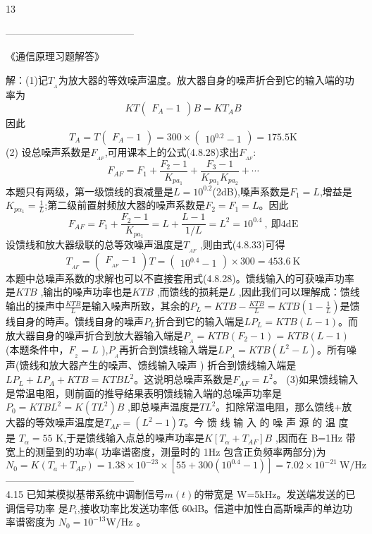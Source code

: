 \documentclass[utf8]{article}
\begin{document}
13

---------------------------------------

《通信原理习题解答》

解：(1)记$T_{_A}$为放大器的等效噪声温度。放大器自身的噪声折合到它的输入端的功率为
$$KT\begin{pmatrix}F_A-1\end{pmatrix}B=KT_AB$$
因此
$$T_A=T\begin{pmatrix}F_A-1\end{pmatrix}=300\times\begin{pmatrix}10^{0.2}-1\end{pmatrix}=175.5\text{K}$$
(2) 设总噪声系数是$F_{_{AF}}$,可用课本上的公式(4.8.28)求出$F_{_{AF}}:$
$$F_{AF}=F_{1}+\frac{F_{2}-1}{K_{pa_{1}}}+\frac{F_{3}-1}{K_{pa_{1}}K_{pa_{2}}}+\cdots $$
本题只有两级，第一级馈线的衰减量是$L=10^{0.2}$(2dB),嗓声系数是$F_1=L$,增益是
$K_{p\alpha_{1}}=\frac{1}{L}$;第二级前置射频放大器的噪声系数是$F_2=F_1=L$。因此
$$F_{AF}=F_{1}+\frac{F_{2}-1}{K_{pa_{1}}}=L+\frac{L-1}{1/L}=L^{2}=10^{0.4}\:,\:\text{即4dE}$$
设馈线和放大器级联的总等效噪声温度是$T_{_{AF}}$ ,则由式(4.8.33)可得
$$T_{_{AF}}=\begin{pmatrix}F_{_{AF}}-1\end{pmatrix}T=\begin{pmatrix}10^{0.4}-1\end{pmatrix}\times300=453.6\:\mathrm{K}$$
本题中总噪声系数的求解也可以不直接套用式(4.8.28)。馈线输入的可获噪声功率是$KTB$ ,输出的噪声功率也是$KTB$ ,而馈线的损耗是$L$ ,因此我们可以理解成：馈线输出的操声中$\frac{KTB}L$是输入噪声所致，其余的$P_L=KTB-\frac{KTB}L=KTB\left(1-\frac1L\right)$是馈线自身的時声。馈线自身的噪声$P_L$折合到它的输入端是$LP_L=KTB(L-1)$。而放大器自身的噪声折合到放大器输入端是$P_{_A}=KTB\left(F_{2}-1\right)=KTB\left(L-1\right)$(本题条件中，$F_{_2}=L$ ),$P_{_A}$再折合到馈线输入端是$LP_{_A}=KTB\left(L^2-L\right)$。所有噪声(馈线和放大器产生的噪声、馈线输入噪声 ) 折合到馈线输入端是$LP_L+LP_A+KTB=KTBL^2$。这说明总噪声系数是$F_{AF}=L^2$。
(3)如果馈线输入是常温电阻，则前面的推导结果表明馈线输入端的总噪声功率是$P_0=KTBL^2=K\left(TL^2\right)B$ ,即总噪声温度是$TL^2$。扣除常温电阻，那么馈线+放大器的等效噪声温度是$T_{AF}= \left ( L^2- 1\right ) T$。今 馈 线 输 入 的 噪 声 源 的 温 度 是 $T_\alpha = 55$ K,于是馈线输入点总的噪声功率是$K[T_\alpha+T_{AF}]B$ ,因而在 B=1Hz 带宽上的测量到的功率( 功率谱密度，测量时的 1Hz 包含正负频率两部分)为
$$N_{0}=K\left(T_{a}+T_{AF}\right)=1.38\times10^{-23}\times\left[55+300\left(10^{0.4}-1\right)\right]=7.02\times10^{-21}\:\mathrm{W/Hz}$$
---------------------------------------\\
4.15 已知某模拟基带系统中调制信号$m(t)$的带宽是 W=5kHz。发送端发送的已调信号功率
是$P_i$,接收功率比发送功率低 60dB。信道中加性白高斯噪声的单边功率谱密度为
$N_0=10^{-13}$W/Hz 。
\end{document}
